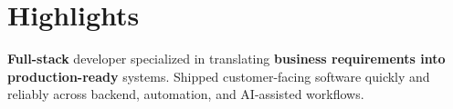 \section{Highlights}

\begin{onecolentry}
    \begin{highlightsforbulletentries}

    \item \textbf{Full-stack} developer specialized in translating \textbf{business requirements into production-ready} systems. Shipped customer-facing software quickly and reliably across backend, automation, and AI-assisted workflows.


    \end{highlightsforbulletentries}
\end{onecolentry}